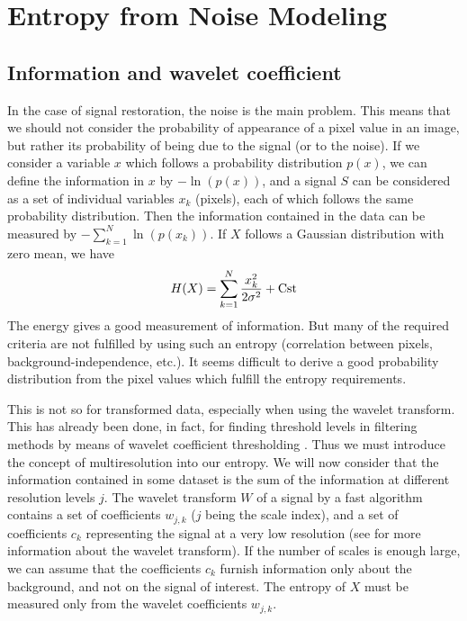 


\section{Entropy from Noise Modeling}
\subsection{Information and wavelet coefficient}
In the case of signal restoration, the noise is the main problem. This 
means that we should not consider the probability of appearance of 
a pixel value in an image, but rather its probability of being due to the
signal (or to the noise). 
If we consider a variable $x$ which follows a probability distribution 
$p(x)$, we
can define the information in $x$ by $- \ln(p(x))$, and a signal $S$ can
be considered as a set of individual variables $x_k$ (pixels), each of which 
follows the same probability distribution. 
Then the information contained in the data 
can be measured by $- \sum_{k=1}^N \ln(p(x_k))$. If $X$ follows a Gaussian 
distribution with zero mean, we have
\begin{eqnarray}
H(X) = \sum_{k=1}^N \frac{x_k^2}{2 \sigma^2} + \rm{Cst}
\end{eqnarray}
The energy gives a good measurement of information. But many of the required
criteria are not fulfilled by using such an entropy (correlation between 
pixels, background-independence, etc.). It seems difficult to derive
a good probability distribution from the pixel values which fulfill the 
entropy requirements.

This is not so for transformed data, especially when using  
the wavelet transform. 
This has  already been done, in fact,
for finding threshold levels in filtering 
methods by means of wavelet coefficient thresholding 
\cite{starck:sta95_1,rest:moulin99,rest:donoho93_1,rest:krim92,wave:chipman97,wave:amato97}. 
Thus we must introduce the concept of multiresolution into our entropy.
We will now consider that the information contained in some dataset
is the sum of the information at different resolution levels $j$.
The wavelet transform $W$ of a signal by a fast algorithm contains a set
of coefficients $w_{j,k}$ ($j$ being the scale index), and a set 
of coefficients $c_{k}$ representing the signal at a very low resolution 
(see \cite{ima:mallat98,starck:book98} for more information about the
wavelet transform). If the number of scales is enough large,
we can assume that the coefficients $c_{k}$ furnish information only
about the background, and not on the signal of interest. The entropy of $X$
must be measured only from the
wavelet coefficients $w_{j,k}$.

